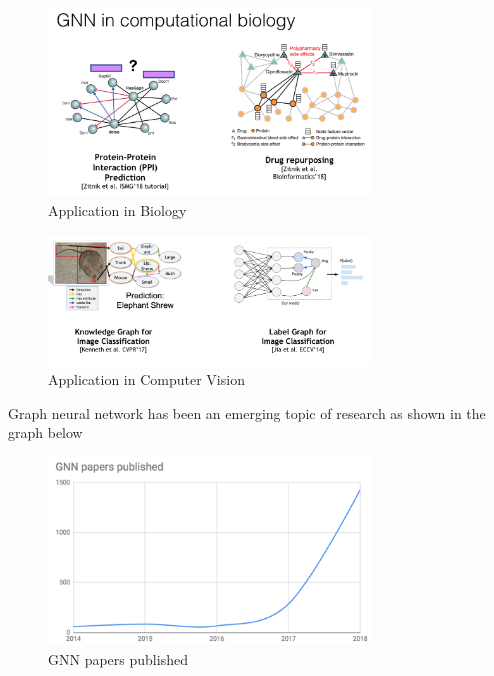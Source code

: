 \begin{figure}[ht]
\begin{center}
  \includegraphics[width=3.38in]{figs/Biology.png}
\end{center}
   \caption{Application in Biology}
\label{fig:CV}
\end{figure}

\begin{figure}[ht]
\begin{center}
  \includegraphics[width=3.38in]{figs/Computer_Vision.png}
\end{center}
   \caption{Application in Computer Vision}
\label{fig:CV}
\end{figure}


Graph neural network has been an emerging topic of research as shown in the graph below

\begin{figure}[ht]
\begin{center}
  \includegraphics[width=3.38in]{figs/GNN Papers Published.png}
\end{center}
   \caption{GNN papers published}
\label{fig:CV}
\end{figure}

